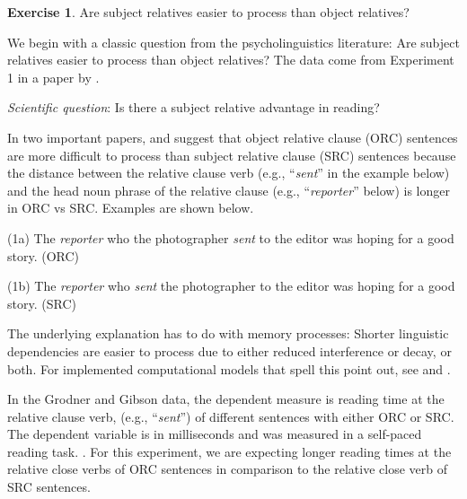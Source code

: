 \documentclass[12pt,]{krantz}
\theoremstyle{definition}
\theoremstyle{definition}
\theoremstyle{definition}
\newtheorem{exercise}{Exercise}[chapter]
\theoremstyle{remark}
\begin{document}
\begin{exercise}
\protect\hypertarget{exr:hierarchical-logn}{}{\label{exr:hierarchical-logn}
}Are subject relatives easier to process than object relatives?
\end{exercise}

We begin with a classic question from the psycholinguistics literature:
Are subject relatives easier to process than object relatives? The data
come from Experiment 1 in a paper by \citet{grodner}.

\emph{Scientific question}: Is there a subject relative advantage in
reading?

In two important papers, \citet{gibson00} and \citet{grodner} suggest
that object relative clause (ORC) sentences are more difficult to
process than subject relative clause (SRC) sentences because the
distance between the relative clause verb (e.g., ``\emph{sent}'' in the
example below) and the head noun phrase of the relative clause (e.g.,
``\emph{reporter}'' below) is longer in ORC vs SRC. Examples are shown
below.

(1a) The \emph{reporter} who the photographer \emph{sent} to the editor
was hoping for a good story. (ORC)

(1b) The \emph{reporter} who \emph{sent} the photographer to the editor
was hoping for a good story. (SRC)

The underlying explanation has to do with memory processes: Shorter
linguistic dependencies are easier to process due to either reduced
interference or decay, or both. For implemented computational models
that spell this point out, see \citet{lewisvasishth:cogsci05} and
\citet{EngelmannJaegerVasishthSubmitted2018}.

In the Grodner and Gibson data, the dependent measure is reading time at
the relative clause verb, (e.g., ``\emph{sent}'') of different sentences
with either ORC or SRC. The dependent variable is in milliseconds and
was measured in a self-paced reading task. \citep[Self-paced reading is
a task where participants read a sentence or a short text word-by-word
or phrase-by-phrase, pressing a button to get the next word or phrase
displayed while the previous one
disappears;][]{aaronsonPerformanceTheoriesSentence1976, mitchellEffectsContextContent1978}.
For this experiment, we are expecting longer reading times at the
relative close verbs of ORC sentences in comparison to the relative
close verb of SRC sentences.
\end{document}
